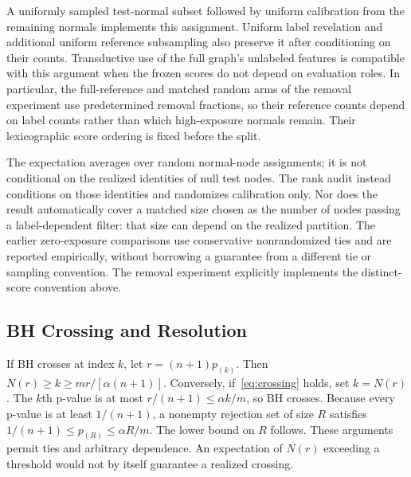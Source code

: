 \documentclass[twoside]{article}
\begin{document}
A uniformly sampled test-normal subset followed by uniform calibration from the remaining normals implements this assignment. Uniform label revelation and additional uniform reference subsampling also preserve it after conditioning on their counts. Transductive use of the full graph's unlabeled features is compatible with this argument when the frozen scores do not depend on evaluation roles. In particular, the full-reference and matched random arms of the removal experiment use predetermined removal fractions, so their reference counts depend on label counts rather than which high-exposure normals remain. Their lexicographic score ordering is fixed before the split.

The expectation averages over random normal-node assignments; it is not conditional on the realized identities of null test nodes. The rank audit instead conditions on those identities and randomizes calibration only. Nor does the result automatically cover a matched size chosen as the number of nodes passing a label-dependent filter: that size can depend on the realized partition. The earlier zero-exposure comparisons use conservative nonrandomized ties and are reported empirically, without borrowing a guarantee from a different tie or sampling convention. The removal experiment explicitly implements the distinct-score convention above.

\subsection{BH Crossing and Resolution}
If BH crosses at index $k$, let $r=(n+1)p_{(k)}$. Then $N(r)\ge k\ge mr/[\alpha(n+1)]$. Conversely, if~\eqref{eq:crossing} holds, set $k=N(r)$. The $k$th p-value is at most $r/(n+1)\le\alpha k/m$, so BH crosses. Because every p-value is at least $1/(n+1)$, a nonempty rejection set of size $R$ satisfies $1/(n+1)\le p_{(R)}\le\alpha R/m$. The lower bound on $R$ follows. These arguments permit ties and arbitrary dependence. An expectation of $N(r)$ exceeding a threshold would not by itself guarantee a realized crossing.
\end{document}
